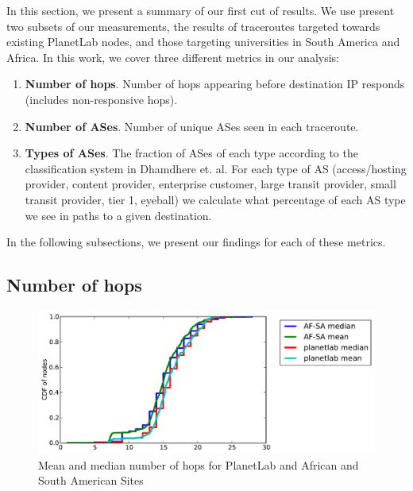 \documentclass{sig-alternate-10pt}
\begin{document}
In this section, we present a summary of our first cut of results. We use
present two subsets of our measurements, the results of traceroutes targeted
towards existing PlanetLab nodes, and those targeting universities in South
America and Africa. In this work, we cover three different metrics in our
analysis:

\begin{enumerate}

\item \textbf{Number of hops}. Number of hops appearing before destination IP
responds (includes non-responsive hops).

\item \textbf{Number of ASes}. Number of unique ASes seen in each traceroute.

\item \textbf{Types of ASes}. The fraction of ASes of each type according to
the classification system in Dhamdhere et. al.  For each type of AS
(access/hosting provider, content provider, enterprise customer, large transit
provider, small transit provider, tier 1, eyeball) we calculate what percentage
of each AS type we see in paths to a given destination.

\end{enumerate}

In the following subsections, we present our findings for each of these
metrics.

\subsection{Number of hops}

\begin{figure}
\centering
    \includegraphics[width=1.0\linewidth]{figs/number_of_hops.pdf}
    \caption{Mean and median number of hops for PlanetLab and African
and South American Sites}
    \label{fig:num_hops}
\end{figure}
\end{document}
